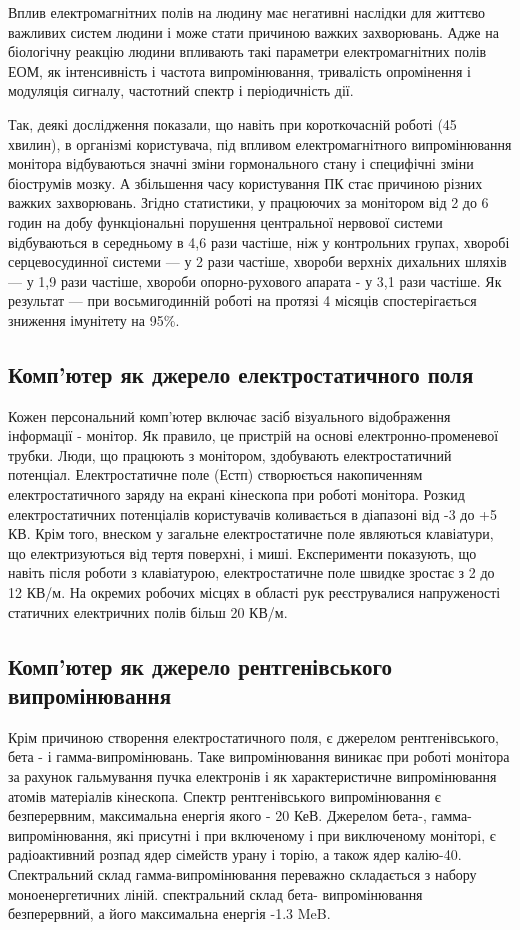 Вплив електромагнітних полів на людину має негативні наслідки для життєво важливих систем людини і 
може стати причиною важких захворювань. Адже на біологічну реакцію людини впливають такі параметри 
електромагнітних полів ЕОМ, як інтенсивність і частота випромінювання, тривалість опромінення і модуляція
 сигналу, частотний спектр і періодичність дії.

Так, деякі дослідження показали, що навіть при короткочасній роботі (45 хвилин), в організмі користувача, 
під впливом електромагнітного випромінювання монітора відбуваються значні зміни гормонального стану і 
специфічні зміни біострумів мозку. А збільшення часу користування ПК стає причиною різних важких захворювань. 
Згідно статистики, у працюючих за монітором від 2 до 6 годин на добу функціональні порушення центральної 
нервової системи відбуваються в середньому в 4,6 рази частіше, ніж у контрольних групах, хворобі серцевосудинної 
системи --- у 2 рази частіше, хвороби верхніх дихальних шляхів --- у 1,9 рази частіше, хвороби опорно-рухового 
апарата - у 3,1 рази частіше. Як результат --- при восьмигодинній роботі на протязі 4 місяців спостерігається 
зниження імунітету на 95\%.


\subsection{Комп'ютер як джерело електростатичного поля}

Кожен персональний комп'ютер включає засіб візуального відображення інформації - монітор. Як правило, це 
пристрій на основі електронно-променевої трубки. Люди, що працюють з монітором, здобувають електростатичний 
потенціал. Електростатичне поле (Естп) створюється накопиченням електростатичного заряду на екрані кінескопа при 
роботі монітора. Розкид електростатичних потенціалів користувачів коливається в діапазоні від -3 до +5 КВ.
Крім того, внеском у загальне електростатичне поле являються клавіатури, що електризуються від тертя поверхні, і 
миші. Експерименти показують, що навіть після роботи з клавіатурою, електростатичне поле швидке зростає з 2 до 
12 КВ/м. На окремих робочих місцях в області рук реєструвалися напруженості статичних електричних полів більш 20 КВ/м.

\subsection{Комп'ютер як джерело рентгенівського випромінювання}

Крім причиною створення електростатичного поля, є джерелом рентгенівського, бета - і гамма-випромінювань. 
Таке випромінювання виникає при роботі монітора за рахунок гальмування пучка електронів і як характеристичне 
випромінювання атомів матеріалів кінескопа. Спектр рентгенівського випромінювання є безперервним, максимальна 
енергія якого - 20 КеВ. Джерелом бета-, гамма-випромінювання, які присутні і при включеному і при виключеному 
моніторі, є радіоактивний розпад ядер сімейств урану і торію, а також ядер калію-40. Спектральний склад гамма-випромінювання 
переважно складається з набору моноенергетичних ліній. спектральний склад бета- випромінювання безперервний, а його 
максимальна енергія -1.3 MeB. 

